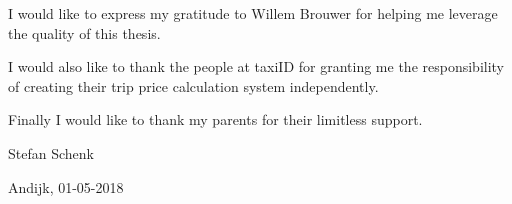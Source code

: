 
\noindent\begin{acknowledgements}

I would like to express my gratitude to Willem Brouwer for helping me leverage the quality of this thesis. \newline

I would also like to thank the people at taxiID for granting me the responsibility of creating their trip price calculation system independently. \newline

Finally I would like to thank my parents for their limitless support. \newline

Stefan Schenk \newline

Andijk, 01-05-2018

\end{acknowledgements}
